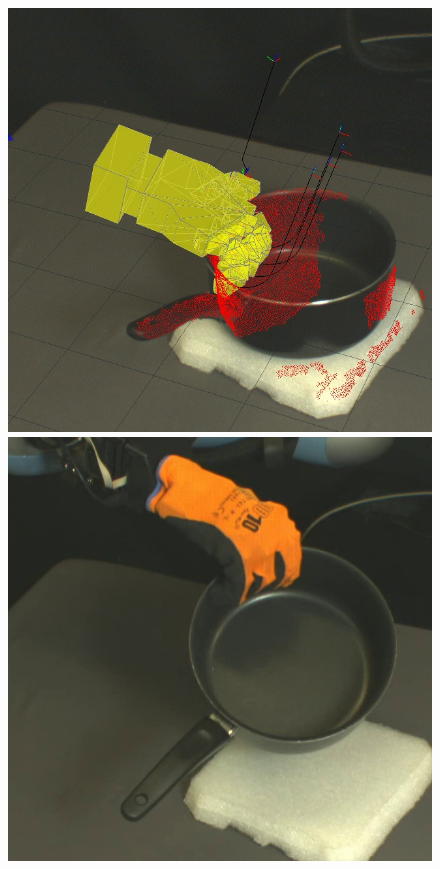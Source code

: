 \begin{figure}
\begin{center}
  \includegraphics[width=\tw]{images/experiments/query/saucepanlarge-1-s}
 \includegraphics[width=\tw]{images/experiments/exec/saucepanlarge-s}

\end{center}
\end{figure}
